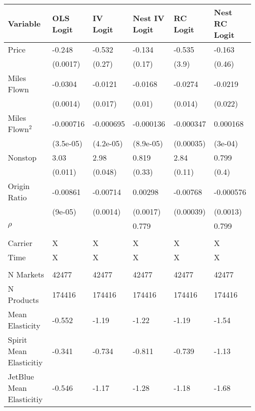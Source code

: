 
\begin{tabular}[t]{llllll}
\toprule
Variable & OLS Logit & IV Logit & Nest IV Logit & RC Logit & Nest RC Logit\\
\midrule
Price & -0.248 & -0.532 & -0.134 & -0.535 & -0.163\\
 & (0.0017) & (0.27) & (0.17) & (3.9) & (0.46)\\
Miles Flown & -0.0304 & -0.0121 & -0.0168 & -0.0274 & -0.0219\\
 & (0.0014) & (0.017) & (0.01) & (0.014) & (0.022)\\
Miles Flown$^2$ & -0.000716 & -0.000695 & -0.000136 & -0.000347 & 0.000168\\
 & (3.5e-05) & (4.2e-05) & (8.9e-05) & (0.00035) & (3e-04)\\
Nonstop & 3.03 & 2.98 & 0.819 & 2.84 & 0.799\\
 & (0.011) & (0.048) & (0.33) & (0.11) & (0.4)\\
Origin Ratio & -0.00861 & -0.00714 & 0.00298 & -0.00768 & -0.000576\\
 & (9e-05) & (0.0014) & (0.0017) & (0.00039) & (0.0013)\\
$\rho$ &  &  & 0.779 &  & 0.799\\
\midrule
\addlinespace[0.3em]
\multicolumn{6}{l}{\textbf{Controls}}\\
\hspace{1em}Carrier & X & X & X & X & X\\
\hspace{1em}Time & X & X & X & X & X\\
\addlinespace[0.3em]
\multicolumn{6}{l}{\textbf{Elasticity Statistics}}\\
\hspace{1em}N Markets & 42477 & 42477 & 42477 & 42477 & 42477\\
\hspace{1em}N Products & 174416 & 174416  & 174416 & 174416 & 174416\\
\hspace{1em}Mean Elasticity & -0.552 & -1.19 & -1.22 & -1.19 & -1.54\\
\hspace{1em}Spirit Mean Elasticitiy & -0.341 & -0.734 & -0.811 & -0.739 & -1.13\\
\hspace{1em}JetBlue Mean Elasticitiy & -0.546 & -1.17 & -1.28 & -1.18 & -1.68\\
\bottomrule
\end{tabular}
